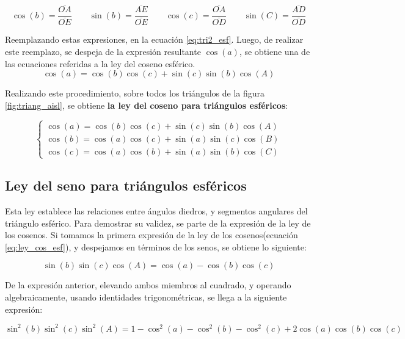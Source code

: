 \begin{equation}
	\cos(b) =  \frac{\overline{OA}}{\overline{OE}} \qquad \sin(b) = \frac{\overline{AE}}{\overline{OE}} \qquad
	\cos(c) = \frac{\overline{OA}}{\overline{OD}} \qquad
	\sin(C) = \frac{\overline{AD}}{\overline{OD}} 
\end{equation}

Reemplazando estas expresiones, en la ecuación \ref{eq:tri2_esf}. Luego, de realizar este reemplazo, se despeja de la expresión resultante $\cos(a)$, se obtiene una de las ecuaciones referidas a la ley del coseno esférico.
\begin{equation}
	\cos(a) = \cos(b)\cos(c) + \sin(c)\sin(b)\cos(A) 
\end{equation}

Realizando este procedimiento, sobre todos los triángulos de la figura \ref{fig:triang_aisl}, se obtiene \textbf{la ley del coseno para triángulos esféricos}: 

\begin{equation} \label{eq:ley_cos_esf}
\left\{\begin{array}{c} 
	\cos(a) = \cos(b)\cos(c) + \sin(c)\sin(b)\cos(A) \\ 
	\cos(b) = \cos(a)\cos(c) + \sin(a)\sin(c)\cos(B) \\	
	\cos(c) = \cos(a) \cos(b) + \sin(a) \sin(b) \cos(C)
\end{array} \right.  
\end{equation}

\subsection{Ley del seno para triángulos esféricos}

Esta ley establece las relaciones entre ángulos diedros, y segmentos angulares del triángulo esférico. Para demostrar su validez, se parte de la expresión de la ley de los cosenos. Si tomamos la primera expresión de la ley de los cosenos(ecuación \ref{eq:ley_cos_esf}), y despejamos en términos de los senos, se obtiene lo siguiente: 

\begin{equation*}
	\sin(b) \sin(c)\cos(A)=\cos(a)-\cos(b)  \cos(c)	
\end{equation*}

De la expresión anterior, elevando ambos miembros al cuadrado, y operando algebraicamente, usando identidades trigonométricas, se llega a la siguiente expresión: 

\begin{equation}
	\sin^2(b)\sin^2(c)\sin^2(A) = 1 - \cos^2(a) - \cos^2(b)-\cos^2(c) + 2\cos(a) \cos(b) \cos(c)
\end{equation}

